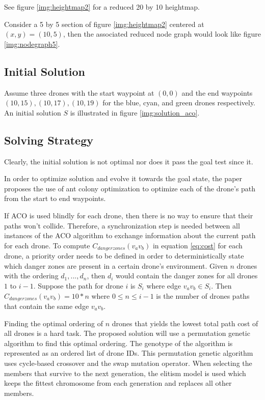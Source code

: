 \documentclass[conference]{IEEEtran}
\begin{document}
See figure \ref{img:heightmap2} for a reduced 20 by 10 heightmap.

Consider a 5 by 5 section of figure \ref{img:heightmap2} centered at $(x, y) = (10, 5)$, then the associated reduced node graph would look like figure \ref{img:nodegraph5}.

\subsection{Initial Solution}
Assume three drones with the start waypoint at $(0, 0)$ and the end waypoints $(10, 15), (10, 17), (10, 19)$ for the blue, cyan, and green drones respectively. An initial solution $S$ is illustrated in figure \ref{img:solution_aco}.

\subsection{Solving Strategy}
Clearly, the initial solution is not optimal nor does it pass the goal test since it.

In order to optimize solution and evolve it towards the goal state, the paper proposes the use of ant colony optimization to optimize each of the drone's path from the start to end waypoints.

If ACO is used blindly for each drone, then there is no way to ensure that their paths won't collide. Therefore, a synchronization step is needed between all instances of the ACO algorithm to exchange information about the current path for each drone. To compute $C_{danger zones}(v_av_b)$ in equation \ref{eq:cost} for each drone, a priority order needs to be defined in order to deterministically state which danger zones are present in a certain drone's environment. Given $n$ drones with the ordering $d_1, ..., d_n$, then $d_i$ would contain the danger zones for all drones $1$ to $i-1$. Suppose the path for drone $i$ is $S_i$ where edge $v_av_b \in S_i$. Then $C_{danger zones}(v_av_b) = 10*n$ where $0 \leq n \leq i-1$ is the number of drones paths that contain the same edge $v_av_b$.

Finding the optimal ordering of $n$ drones that yields the lowest total path cost of all drones is a hard task. The proposed solution will use a permutation genetic algorithm to find this optimal ordering. The genotype of the algorithm is represented as an ordered list of drone IDs. This permutation genetic algorithm uses cycle-based crossover and the swap mutation operator. When selecting the members that survive to the next generation, the elitism model is used which keeps the fittest chromosome from each generation and replaces all other members.
\end{document}
